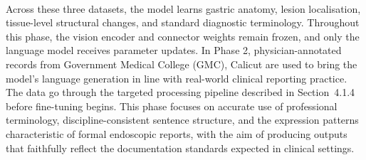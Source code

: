 ﻿﻿\documentclass[12pt]{report}
\begin{document}
Across these three datasets, the model learns gastric anatomy, lesion localisation, tissue-level structural changes, and standard diagnostic terminology. Throughout this phase, the vision encoder and connector weights remain frozen, and only the language model receives parameter updates.
In Phase 2, physician-annotated records from Government Medical College (GMC), Calicut are used to bring the model's language generation in line with real-world clinical reporting practice. The data go through the targeted processing pipeline described in Section~4.1.4 before fine-tuning begins. This phase focuses on accurate use of professional terminology, discipline-consistent sentence structure, and the expression patterns characteristic of formal endoscopic reports, with the aim of producing outputs that faithfully reflect the documentation standards expected in clinical settings.
\end{document}
